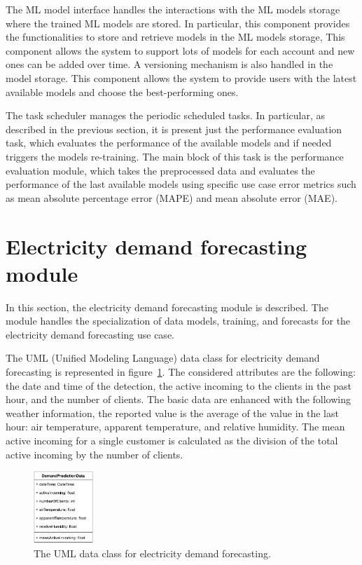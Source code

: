 The ML model interface handles the interactions with the ML models storage where the trained ML models are stored.
In particular, this component provides the functionalities to store and retrieve models in the ML models storage,
This component allows the system to support lots of models for each account and new ones can be added over time.
A versioning mechanism is also handled in the model storage.
This component allows the system to provide users with the latest available models and choose the best-performing ones.

The task scheduler manages the periodic scheduled tasks.
In particular, as described in the previous section, it is present just the performance evaluation task, which evaluates the performance of the available models and if needed triggers the models re-training.
The main block of this task is the performance evaluation module, which takes the preprocessed data and evaluates the performance of the last available models using specific use case error metrics such as mean absolute percentage error (MAPE) and mean absolute error (MAE).


\section{Electricity demand forecasting module}
\label{sec:demandmodel}
\vspace{0.2 cm}

In this section, the electricity demand forecasting module is described.
The module handles the specialization of data models, training, and forecasts for the electricity demand forecasting use case.

The UML (Unified Modeling Language) data class for electricity demand forecasting is represented in figure~\ref{fig:umldemand}.
The considered attributes are the following: the date and time of the detection, the active incoming to the clients in the past hour, and the number of clients.
The basic data are enhanced with the following weather information, the reported value is the average of the value in the last hour: air temperature, apparent temperature, and relative humidity.
The mean active incoming for a single customer is calculated as the division of the total active incoming by the number of clients.

\begin{figure}[H]
\centering
\includegraphics[width=0.20\textwidth]{images/demand_prediction_uml}
\caption{The UML data class for electricity demand forecasting.}
\label{fig:umldemand}
\end{figure}

